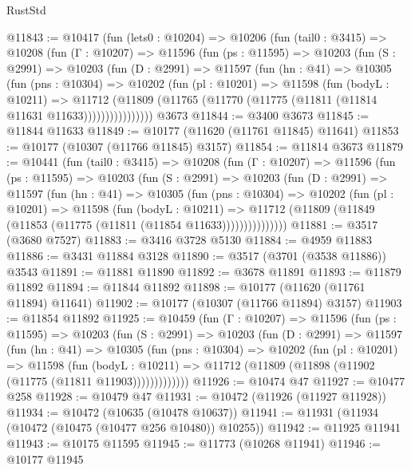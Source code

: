 \begin{lexlean}{RustStd}
\begin{coremodule}
@11843 := @10417
    (fun (lets0 : @10204) =>
    @10206
      (fun (tail0 : @3415) =>
      @10208
        (fun (Γ : @10207) =>
        @11596
          (fun (ps : @11595) =>
          @10203
            (fun (S : @2991) =>
            @10203
              (fun (D : @2991) =>
              @11597
                (fun (hn : @41) =>
                @10305
                  (fun (pns : @10304) =>
                  @10202
                    (fun (pl : @10201) =>
                    @11598
                      (fun (bodyL : @10211) =>
                      @11712
                        (@11809
                          (@11765 (@11770 (@11775 (@11811 (@11814 @11631 @11633))))))))))))))))
    @3673
@11844 := @3400 @3673
@11845 := @11844 @11633
@11849 := @10177 (@11620 (@11761 @11845) @11641)
@11853 := @10177 (@10307 (@11766 @11845) @3157)
@11854 := @11814 @3673
@11879 := @10441
    (fun (tail0 : @3415) =>
    @10208
      (fun (Γ : @10207) =>
      @11596
        (fun (ps : @11595) =>
        @10203
          (fun (S : @2991) =>
          @10203
            (fun (D : @2991) =>
            @11597
              (fun (hn : @41) =>
              @10305
                (fun (pns : @10304) =>
                @10202
                  (fun (pl : @10201) =>
                  @11598
                    (fun (bodyL : @10211) =>
                    @11712 (@11809 (@11849 (@11853 (@11775 (@11811 (@11854 @11633)))))))))))))))
@11881 := @3517 (@3680 @7527)
@11883 := @3416 @3728 @5130
@11884 := @4959 @11883
@11886 := @3431 @11884 @3128
@11890 := @3517 (@3701 (@3538 @11886)) @3543
@11891 := @11881 @11890
@11892 := @3678 @11891
@11893 := @11879 @11892
@11894 := @11844 @11892
@11898 := @10177 (@11620 (@11761 @11894) @11641)
@11902 := @10177 (@10307 (@11766 @11894) @3157)
@11903 := @11854 @11892
@11925 := @10459
    (fun (Γ : @10207) =>
    @11596
      (fun (ps : @11595) =>
      @10203
        (fun (S : @2991) =>
        @10203
          (fun (D : @2991) =>
          @11597
            (fun (hn : @41) =>
            @10305
              (fun (pns : @10304) =>
              @10202
                (fun (pl : @10201) =>
                @11598
                  (fun (bodyL : @10211) =>
                  @11712 (@11809 (@11898 (@11902 (@11775 (@11811 @11903)))))))))))))
@11926 := @10474 @47
@11927 := @10477 @258
@11928 := @10479 @47
@11931 := @10472 (@11926 (@11927 @11928))
@11934 := @10472 (@10635 (@10478 @10637))
@11941 := @11931 (@11934 (@10472 (@10475 (@10477 @256 @10480)) @10255))
@11942 := @11925 @11941
@11943 := @10175 @11595
@11945 := @11773 (@10268 @11941)
@11946 := @10177 @11945

\end{coremodule}
\end{lexlean}
